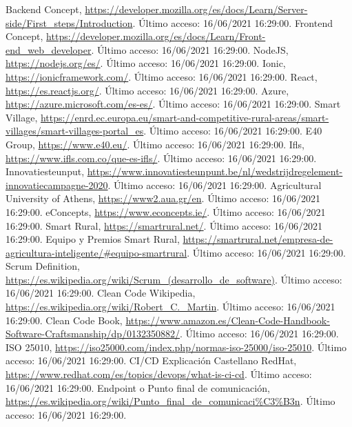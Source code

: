 \begin{thebibliography}{9}
     Backend Concept, \url{https://developer.mozilla.org/es/docs/Learn/Server-side/First_steps/Introduction}. Último acceso: 16/06/2021 16:29:00.
     Frontend Concept, \url{https://developer.mozilla.org/es/docs/Learn/Front-end_web_developer}. Último acceso: 16/06/2021 16:29:00.
     NodeJS, \url{https://nodejs.org/es/}. Último acceso: 16/06/2021 16:29:00.
     Ionic, \url{https://ionicframework.com/}. Último acceso: 16/06/2021 16:29:00.
     React, \url{https://es.reactjs.org/}. Último acceso: 16/06/2021 16:29:00.
     Azure, \url{https://azure.microsoft.com/es-es/}. Último acceso: 16/06/2021 16:29:00.
     Smart Village, \url{https://enrd.ec.europa.eu/smart-and-competitive-rural-areas/smart-villages/smart-villages-portal_es}. Último acceso: 16/06/2021 16:29:00.
     E40 Group, \url{https://www.e40.eu/}. Último acceso: 16/06/2021 16:29:00.
     Ifls, \url{https://www.ifls.com.co/que-es-ifls/}. Último acceso: 16/06/2021 16:29:00.
     Innovatiesteunput, \url{https://www.innovatiesteunpunt.be/nl/wedstrijdregelement-innovatiecampagne-2020}. Último acceso: 16/06/2021 16:29:00.
     Agricultural University of Athens, \url{https://www2.aua.gr/en}. Último acceso: 16/06/2021 16:29:00.
     eConcepts, \url{https://www.econcepts.ie/}. Último acceso: 16/06/2021 16:29:00.
     Smart Rural, \url{https://smartrural.net/}. Último acceso: 16/06/2021 16:29:00.
     Equipo y Premios Smart Rural, \url{https://smartrural.net/empresa-de-agricultura-inteligente/#equipo-smartrural}. Último acceso: 16/06/2021 16:29:00.
     Scrum Definition, \url{https://es.wikipedia.org/wiki/Scrum_(desarrollo_de_software)}. Último acceso: 16/06/2021 16:29:00.
     Clean Code Wikipedia, \url{https://es.wikipedia.org/wiki/Robert_C._Martin}. Último acceso: 16/06/2021 16:29:00.
     Clean Code Book, \url{https://www.amazon.es/Clean-Code-Handbook-Software-Craftsmanship/dp/0132350882/}. Último acceso: 16/06/2021 16:29:00.
     ISO 25010, \url{https://iso25000.com/index.php/normas-iso-25000/iso-25010}. Último acceso: 16/06/2021 16:29:00.
     CI/CD Explicación Castellano RedHat, \url{https://www.redhat.com/es/topics/devops/what-is-ci-cd}. Último acceso: 16/06/2021 16:29:00.
     Endpoint o Punto final de comunicación, \url{https://es.wikipedia.org/wiki/Punto_final_de_comunicaci\%C3\%B3n}. Último acceso: 16/06/2021 16:29:00.

\end{thebibliography}
